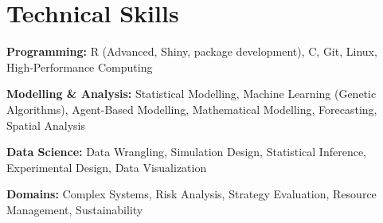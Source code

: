 \documentclass[letterpaper]{article}
\renewenvironment{itemize}{
  \begin{list}{}{
    \setlength{\leftmargin}{1.5em}
  }
}{
  \end{list}
}
\begin{document}
\begin{minipage}{0.65\linewidth}
\section*{Technical Skills}
\begin{itemize}
  \item {\bf Programming:} R (Advanced, Shiny, package development), C, Git, Linux, High-Performance Computing
  \item {\bf Modelling \& Analysis:} Statistical Modelling, Machine Learning (Genetic Algorithms), Agent-Based Modelling, Mathematical Modelling, Forecasting, Spatial Analysis
  \item {\bf Data Science:} Data Wrangling, Simulation Design, Statistical Inference, Experimental Design, Data Visualization
  \item {\bf Domains:} Complex Systems, Risk Analysis, Strategy Evaluation, Resource Management, Sustainability
\end{itemize}

\end{minipage}
\begin{minipage}{0.35\linewidth}
\end{minipage}
\end{document}
